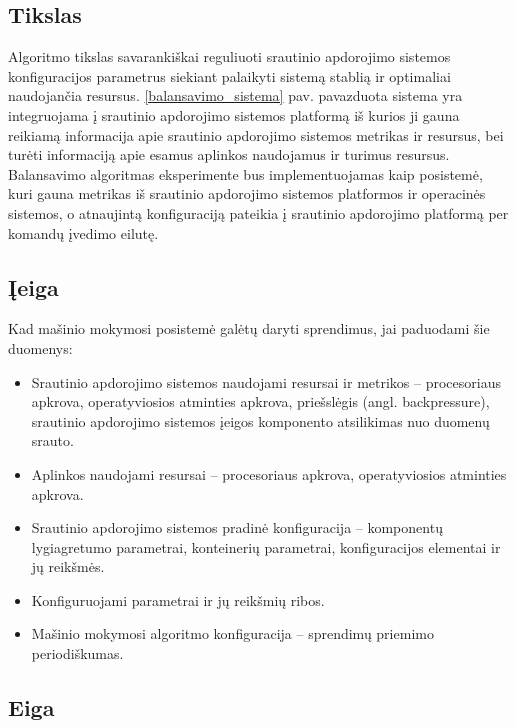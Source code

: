 \documentclass{VUMIFPSbakalaurinis}
\begin{document}
\subsection{Tikslas}
Algoritmo tikslas savarankiškai reguliuoti srautinio apdorojimo sistemos konfiguracijos parametrus siekiant palaikyti sistemą stablią ir optimaliai naudojančia resursus. \ref{balansavimo_sistema} pav. pavazduota sistema yra integruojama į srautinio apdorojimo sistemos platformą iš kurios ji gauna reikiamą informacija apie srautinio apdorojimo sistemos metrikas ir resursus, bei turėti informaciją apie esamus aplinkos naudojamus ir turimus resursus. Balansavimo algoritmas eksperimente bus implementuojamas kaip posistemė, kuri gauna metrikas iš srautinio apdorojimo sistemos platformos ir operacinės sistemos, o atnaujintą konfiguraciją pateikia į srautinio apdorojimo platformą per komandų įvedimo eilutę.

\subsection{Įeiga}
Kad mašinio mokymosi posistemė galėtų daryti sprendimus, jai paduodami šie duomenys:
\begin{itemize}
    \item Srautinio apdorojimo sistemos naudojami resursai ir metrikos – procesoriaus apkrova, operatyviosios atminties apkrova, priešslėgis (angl. backpressure), srautinio apdorojimo sistemos įeigos komponento atsilikimas nuo duomenų srauto.
    \item Aplinkos naudojami resursai – procesoriaus apkrova, operatyviosios atminties apkrova.
    \item Srautinio apdorojimo sistemos pradinė konfiguracija – komponentų lygiagretumo parametrai, konteinerių parametrai, konfiguracijos elementai ir jų reikšmės.
    \item Konfiguruojami parametrai ir jų reikšmių ribos.
    \item Mašinio mokymosi algoritmo konfiguracija – sprendimų priemimo periodiškumas.
\end{itemize}

\subsection{Eiga}
\end{document}
